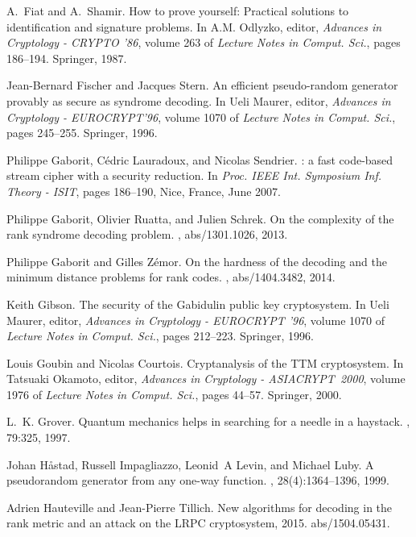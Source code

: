 \documentclass[11pt, a4paper]{llncs}
\begin{document}
\begin{thebibliography}{10}
A.~Fiat and A.~Shamir.
\newblock How to prove yourself: Practical solutions to identification and
  signature problems.
\newblock In A.M. Odlyzko, editor, {\em Advances in Cryptology - CRYPTO '86},
  volume 263 of {\em Lecture Notes in Comput. Sci.}, pages 186--194. Springer,
  1987.

Jean-Bernard Fischer and Jacques Stern.
\newblock An efficient pseudo-random generator provably as secure as syndrome
  decoding.
\newblock In Ueli Maurer, editor, {\em Advances in Cryptology - EUROCRYPT'96},
  volume 1070 of {\em Lecture Notes in Comput. Sci.}, pages 245--255. Springer,
  1996.

Philippe Gaborit, C{\'{e}}dric Lauradoux, and Nicolas Sendrier.
: a fast code-based stream cipher with a security reduction.
\newblock In {\em Proc. IEEE Int. Symposium Inf. Theory - ISIT}, pages
  186--190, Nice, France, June 2007.

Philippe Gaborit, Olivier Ruatta, and Julien Schrek.
\newblock On the complexity of the rank syndrome decoding problem.
, abs/1301.1026, 2013.

Philippe Gaborit and Gilles Z{\'{e}}mor.
\newblock On the hardness of the decoding and the minimum distance problems for
  rank codes.
, abs/1404.3482, 2014.

Keith Gibson.
\newblock The security of the {Gabidulin} public key cryptosystem.
\newblock In Ueli Maurer, editor, {\em Advances in Cryptology - EUROCRYPT '96},
  volume 1070 of {\em Lecture Notes in Comput. Sci.}, pages 212--223. Springer,
  1996.

Louis Goubin and Nicolas Courtois.
\newblock Cryptanalysis of the {TTM} cryptosystem.
\newblock In Tatsuaki Okamoto, editor, {\em Advances in Cryptology -
  ASIACRYPT~2000}, volume 1976 of {\em Lecture Notes in Comput. Sci.}, pages
  44--57. Springer, 2000.

L.~K. Grover.
\newblock Quantum mechanics helps in searching for a needle in a haystack.
, 79:325, 1997.

Johan H{\aa}stad, Russell Impagliazzo, Leonid~A Levin, and Michael Luby.
\newblock A pseudorandom generator from any one-way function.
, 28(4):1364--1396, 1999.

Adrien Hauteville and Jean-Pierre Tillich.
\newblock New algorithms for decoding in the rank metric and an attack on the
  {LRPC} cryptosystem, 2015.
\newblock abs/1504.05431.


\end{thebibliography}
\end{document}
